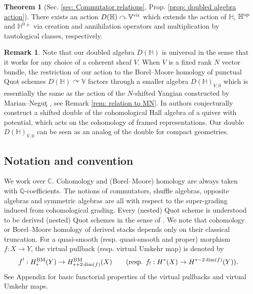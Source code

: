 \documentclass[10pt]{amsart}
\newcommand{\BQ}{\mathbb{Q}}
\newcommand{\BC}{\mathbb{C}}
\newcommand{\BH}{\mathbb{H}}
\newcommand{\BV}{\mathbb{V}}
\newcommand{\BM}{\textnormal{BM}}
\newcommand{\op}{\textnormal{op}}
\newcommand{\+}{{}^+}
\newcommand{\vir}{\textnormal{vir}}
\theoremstyle{definition}
\theoremstyle {definition}
\newtheorem{remark}[theorem]{Remark}
\theoremstyle {definition}
\newtheorem{introtheorem}{Theorem}
\begin{document}
\begin{introtheorem}[Sec. \ref{sec: Commutator relations}, Prop. \ref{prop: doubled algebra action}]
    There exists an action $D(\BH) \curvearrowright \BV^\vir$ which extends the action of $\BH$, $\BH^\op$ and $\BH^{0\pm}$ via creation and annihilation operators and multiplication by tautological classes, respectively. 
\end{introtheorem}

\begin{remark}
    Note that our doubled algebra $D(\BH)$ is universal in the sense that it works for any choice of a coherent sheaf $V$. When $V$ is a fixed rank $N$ vector bundle, the restriction of our action to the Borel--Moore homology of punctual Quot schemes $D(\BH)\curvearrowright \BV$ factors through a smaller algebra $D(\BH)_{V,0}$ which is essentially the same as the action of the $N$-shifted Yangian constructed by Marian--Negu\c t \cite{marian2026cohomologyquotschemesmooth}, see Remark \ref{rem: relation to MN}. In \cite{cao2026shiftedquantumgroupscritical} authors conjecturally construct a shifted double of the cohomological Hall algebra of a quiver with potential, which acts on the cohomology of framed representations. Our double $D(\mathbb{H})_{V,0}$ can be seen as an analog of the double for compact geometries.
\end{remark}










\subsection{Notation and convention}
We work over $\BC$. Cohomology and (Borel--Moore) homology are always taken with $\BQ$-coefficients. The notions of commutators, shuffle algebras, opposite algebras and symmetric algebras are all with respect to the super-grading induced from cohomological grading. Every (nested) Quot scheme is understood to be derived (nested) Quot schemes in the sense of \cite{Adhikari, Monavari-Pavia-Ricolfi}. We note that cohomology or Borel--Moore homology of derived stacks depends only on their classical truncation. For a quasi-smooth (resp. quasi-smooth and proper) morphism $f:X\rightarrow Y$, the virtual pullback (resp. virtual Umkehr map) is denoted by 
$$f^!:H^\BM_*(Y)\rightarrow H^\BM_{*+2\dim(f)}(X)\quad\quad \textnormal{(resp. }f_!:H^*(X)\rightarrow H^{*-2\dim(f)}(Y)\textnormal{)}.
$$
See Appendix for basic functorial properties of the virtual pullbacks and virtual Umkehr maps. 
\end{document}
